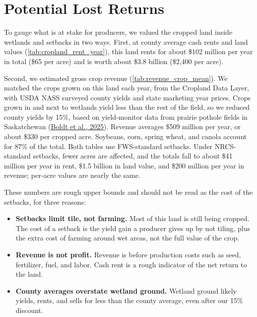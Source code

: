 \documentclass{theme/arpc-memo}
\begin{document}
\section{Potential Lost Returns}

To gauge what is at stake for producers, we valued the cropped land inside wetlands and setbacks in two ways. First, at county average cash rents and land values (\autoref{tab:cropland_rent_year}), this land rents for about \$102 million per year in total (\$65 per acre) and is worth about \$3.8 billion (\$2,400 per acre).

Second, we estimated gross crop revenue (\autoref{tab:revenue_crop_mean}). We matched the crops grown on this land each year, from the Cropland Data Layer, with USDA NASS surveyed county yields and state marketing year prices. Crops grown in and next to wetlands yield less than the rest of the field, so we reduced county yields by 15\%, based on yield-monitor data from prairie pothole fields in Saskatchewan (\href{https://doi.org/10.1016/j.agsy.2024.104169}{Boldt et al., 2025}). Revenue averages \$509 million per year, or about \$330 per cropped acre. Soybeans, corn, spring wheat, and canola account for 87\% of the total. Both tables use FWS-standard setbacks. Under NRCS-standard setbacks, fewer acres are affected, and the totals fall to about \$41 million per year in rent, \$1.5 billion in land value, and \$200 million per year in revenue; per-acre values are nearly the same.





These numbers are rough upper bounds and should not be read as the cost of the setbacks, for three reasons:

\begin{itemize}
\item \textbf{Setbacks limit tile, not farming.} Most of this land is still being cropped. The cost of a setback is the yield gain a producer gives up by not tiling, plus the extra cost of farming around wet areas, not the full value of the crop.
\item \textbf{Revenue is not profit.} Revenue is before production costs such as seed, fertilizer, fuel, and labor. Cash rent is a rough indicator of the net return to the land.
\item \textbf{County averages overstate wetland ground.} Wetland ground likely yields, rents, and sells for less than the county average, even after our 15\% discount.
\end{itemize}
\end{document}
